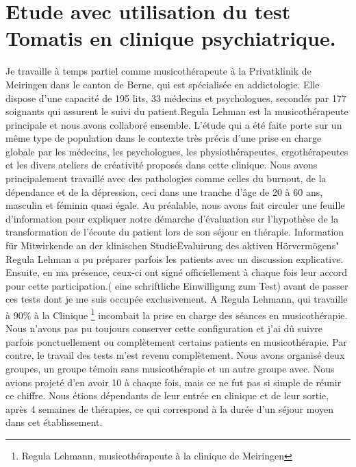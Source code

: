 \chapter{Etude avec utilisation du test Tomatis en clinique psychiatrique.}
Je travaille à temps partiel comme musicothérapeute à la  Privatklinik de Meiringen dans le canton de Berne, qui est spécialisée en addictologie. Elle dispose d'une capacité de 195 lits, 33 médecins et psychologues, secondés par 177 soignants qui assurent le suivi du patient.Regula Lehman est la musicothérapeute principale et nous avons collaboré ensemble. L'étude qui a été faite porte sur un même type de population dans le contexte très précis d'une prise en charge globale par  les médecins, les psychologues, les physiothérapeutes, ergothérapeutes et les divers ateliers de créativité proposés dans cette clinique. Nous avons principalement travaillé avec des pathologies comme celles du burnout, de la dépendance et de la  dépression, ceci dans une tranche d'âge de 20 à 60 ans, masculin et féminin quasi égale. Au préalable, nous avons fait circuler une feuille d'information pour expliquer notre démarche d'évaluation sur  l'hypothèse de la transformation de l'écoute du patient lors de son séjour en thérapie. Information für Mitwirkende an der klinischen Studie\"Evaluirung des aktiven Hörvermögens" Regula Lehman a pu préparer parfois  les patients avec un discussion explicative. Ensuite, en ma présence, ceux-ci ont signé officiellement  à chaque fois leur accord pour cette participation.( eine schriftliche Einwilligung zum Test) avant de passer ces tests dont je me suis occupée exclusivement.
A Regula Lehmann, qui travaille à 90\%
à la Clinique \footnote{Regula Lehmann, musicothérapeute à la clinique de Meiringen}
incombait la prise en charge des séances en musicothérapie. Nous n'avons pas pu toujours conserver cette configuration et j'ai dû suivre parfois ponctuellement ou complètement certains patients en musicothérapie. Par contre, le travail des tests m'est revenu complètement. 
Nous avons  organisé  deux groupes, un groupe témoin sans musicothérapie et un autre groupe avec. Nous avions projeté d'en avoir 10 à chaque fois, mais ce ne fut pas si simple de réunir ce chiffre. Nous étions dépendants de leur entrée en clinique et de leur sortie, après 4 semaines de thérapies, ce qui correspond à la durée d'un séjour moyen dans cet établissement.
